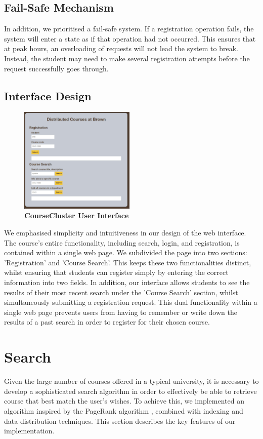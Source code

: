 \documentclass[sigplan, screen, 10pt]{acmart}
\begin{document}
\subsection{Fail-Safe Mechanism}
In addition, we prioritised a fail-safe system. If a registration operation fails, the system will enter a state as if that operation had not occurred. This ensures that at peak hours, an overloading of requests will not lead the system to break. Instead, the student may need to make several registration attempts before the request successfully goes through.

\subsection{Interface Design}
\begin{figure}[!htb]
  \centering
  \includegraphics[width=0.49\textwidth]{./figs/webpage.png}
  \caption{
    \textbf{CourseCluster User Interface}
  }
\end{figure}
We emphasised simplicity and intuitiveness in our design of the web interface. The course's entire functionality, including search, login, and registration, is contained within a single web page. We subdivided the page into two sections: 'Registration' and 'Course Search'. This keeps these two functionalities distinct, whilst ensuring that students can register simply by entering the correct information into two fields. In addition, our interface allows students to see the results of their most recent search under the 'Course Search' section, whilst simultaneously submitting a registration request. This dual functionality within a single web page prevents users from having to remember or write down the results of a past search in order to register for their chosen course.

\section{Search}
Given the large number of courses offered in a typical university, it is necessary to develop a sophisticated search algorithm in order to effectively be able to retrieve course that best match the user's wishes. To achieve this, we implemented an algorithm inspired by the PageRank algorithm \cite{google}, combined with indexing and data distribution techniques. This section describes the key features of our implementation.
\end{document}
